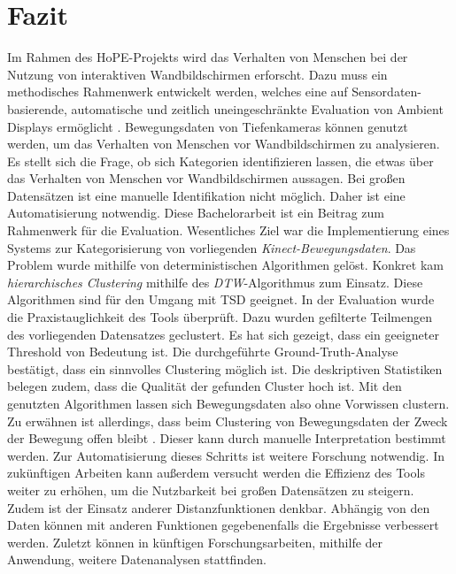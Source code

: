 \chapter{Fazit}
\label{chapter7}
Im Rahmen des HoPE-Projekts wird das Verhalten von Menschen
bei der Nutzung von interaktiven Wandbildschirmen erforscht.
Dazu muss ein methodisches Rahmenwerk entwickelt werden, welches eine auf Sensordaten-basierende,
automatische und zeitlich uneingeschränkte Evaluation von Ambient Displays ermöglicht \citep{unibw_honeypot-effekt_2021}.
Bewegungsdaten von Tiefenkameras können genutzt werden,
um das Verhalten von Menschen vor Wandbildschirmen zu analysieren.
Es stellt sich die Frage, ob sich Kategorien identifizieren lassen,
die etwas über das Verhalten von Menschen vor Wandbildschirmen aussagen.
Bei großen Datensätzen ist eine manuelle Identifikation nicht möglich.
Daher ist eine Automatisierung notwendig.
Diese Bachelorarbeit ist ein Beitrag zum Rahmenwerk für die Evaluation.
Wesentliches Ziel war die Implementierung eines Systems zur Kategorisierung von vorliegenden \emph{Kinect-Bewegungsdaten}.
Das Problem wurde mithilfe von deterministischen Algorithmen gelöst.
Konkret kam \emph{hierarchisches Clustering} mithilfe des \emph{\ac{DTW}}-Algorithmus zum Einsatz.
Diese Algorithmen sind für den Umgang mit \ac{TSD} geeignet.
In der Evaluation wurde die Praxistauglichkeit des Tools überprüft.
Dazu wurden gefilterte Teilmengen des vorliegenden Datensatzes geclustert.
Es hat sich gezeigt, dass ein geeigneter Threshold von Bedeutung ist.
Die durchgeführte Ground-Truth-Analyse bestätigt, dass ein sinnvolles Clustering möglich ist.
Die deskriptiven Statistiken belegen zudem, dass die Qualität der gefunden Cluster hoch ist.
Mit den genutzten Algorithmen lassen sich Bewegungsdaten also ohne Vorwissen clustern.
Zu erwähnen ist allerdings, dass beim Clustering von Bewegungsdaten
der Zweck der Bewegung offen bleibt \citep{monastero_traces_2018}.
Dieser kann durch manuelle Interpretation bestimmt werden.
Zur Automatisierung dieses Schritts ist weitere Forschung notwendig.
In zukünftigen Arbeiten kann außerdem versucht werden die Effizienz des Tools weiter zu erhöhen,
um die Nutzbarkeit bei großen Datensätzen zu steigern.
Zudem ist der Einsatz anderer Distanzfunktionen denkbar.
Abhängig von den Daten können mit anderen Funktionen gegebenenfalls die Ergebnisse verbessert werden.
Zuletzt können in künftigen Forschungsarbeiten, mithilfe der Anwendung, weitere Datenanalysen stattfinden.